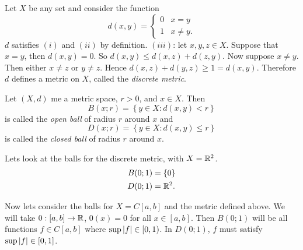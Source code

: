 \begin{example}[]
	Let $X$ be any set and consider the function \[
		d(x,y) =
		\begin{cases}
			0 & x = y \\
			1 & x \neq y.
		\end{cases}
	\]
	$d$ satisfies $(i)$ and $(ii)$ by definition.
	$(iii)$: let $x,y,z \in X$.
	Suppose that $x = y$, then $d(x,y) = 0$. So
	$d(x,y) \leq d(x,z) + d(z,y)$.
	Now suppose $x \neq y$.
	Then either $x \neq z$ or $y \neq z$. Hence
	$d(x,z) + d(y,z) \geq 1 = d(x,y)$.
	Therefore $d$ defines a metric on $X$,
	called the \emph{discrete metric}.
\end{example}

\begin{definition}
	Let $(X,d)$ me a metric space, $r > 0$, and $x \in X$.
	Then \[
		B(x;r) = \left\{ y \in X : d(x,y) < r \right\}
	\]
	is called the \emph{open ball} of radius $r$ around $x$ and \[
		D(x;r) = \left\{ y \in X: d(x,y) \leq r \right\}
	\]
	is called the \emph{closed ball} of radius $r$ around $x$. 
\end{definition}

\begin{example}[]
	Lets look at the balls for the discrete metric, with $X = \mathbb{R}^2$.
	\begin{align*}
		B(0;1) &= \{0\} \\
		D(0;1) &= \mathbb{R}^2.
	\end{align*}
\end{example}

\begin{example}[]
	Now lets consider the balls for $X = C[a,b]$ and the metric defined above.
	We will take $0:[a,b] \to \mathbb{R}$, $0(x) = 0$ for all $x \in [a,b]$.
	Then $B(0;1)$ will be all functions $f \in C[a,b]$ where 
	$\sup\left\lvert f \right\rvert \in [0,1)$.
	In $D(0;1)$, $f$ must satisfy $\sup\left\lvert f \right\rvert \in [0,1]$.
\end{example}

